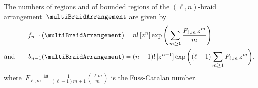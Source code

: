 \begin{table}
	\centerline{}
	\vspace{.3cm}
	\caption{The numbers $b_{n-1}(\multiBraidArrangement)$ of bounded regions of~$\multiBraidArrangement$ for~$\ell,n \in [8]$.}
	\label{table:boundedRegionsMultiBraidArrangement}
\end{table}

\begin{corollary}
\label{coro:regionsMultiBraidArrangement}
The numbers of regions and of bounded regions of the $(\ell,n)$-braid arrangement~$\multiBraidArrangement$ are given by
\begin{align*}
f_{n-1}(\multiBraidArrangement) 
& = n! \, [z^n] \exp \Bigg( \sum_{m \ge 1} \frac{F_{\ell,m} \, z^m}{m} \Bigg) \\
\text{and}\qquad
b_{n-1}(\multiBraidArrangement)
& = (n-1)! \, [z^{n-1}] \exp \bigg( (\ell-1) \sum_{m \ge 1} F_{\ell,m} \, z^m \bigg).
\end{align*}
where~$\displaystyle F_{\ell,m} \eqdef \frac{1}{(\ell-1)m+1} \binom{\ell m}{m}$ is the Fuss-Catalan number.
\end{corollary}

